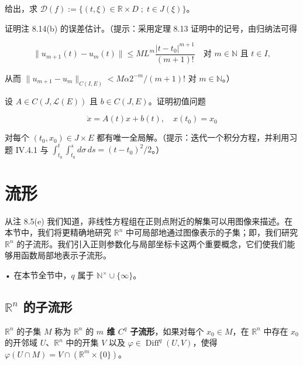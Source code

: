 \begin{exercises}
给出，求 $ \mathcal{D}(f) := \{(t,\xi) \in \mathbb{R}\times D \; ; \; t \in J(\xi)\} $。

\item

证明注 8.14(b) 的误差估计。（提示：采用定理 8.13 证明中的记号，由归纳法可得

\[
\|u_{m+1}(t)-u_{m}(t)\| \le ML^{m}\frac{|t-t_{0}|^{m+1}}{(m+1)!} \quad \text{对 } m \in \mathbb{N} \text{ 且 } t \in I ,
\]

从而 $ \|u_{m+1}-u_{m}\|_{C(I,E)} < M\alpha 2^{-m}/(m+1)! $ 对 $ m \in \mathbb{N} $。）

\item

设 $ A \in C(J,\mathcal{L}(E)) $ 且 $ b \in C(J,E) $。证明初值问题

\[
\dot{x} = A(t)x + b(t) , \quad x(t_{0}) = x_{0}
\]

对每个 $ (t_{0},x_{0}) \in J\times E $ 都有唯一全局解。（提示：迭代一个积分方程，并利用习题 IV.4.1 与 $ \int_{t_{0}}^{t}\int_{t_{0}}^{s} d\sigma\, ds = (t-t_{0})^{2}/2 $。）

\end{exercises}

\section{流形}

从注 8.5(e) 我们知道，非线性方程组在正则点附近的解集可以用图像来描述。在本节中，我们将更精确地研究 $ \mathbb{R}^{n} $ 中可局部地通过图像表示的子集；即，我们研究 $ \mathbb{R}^{n} $ 的子流形。我们引入正则参数化与局部坐标卡这两个重要概念，它们使我们能够用函数局部地表示子流形。

• 在本节全节中，$ q $ 属于 $ \mathbb{N}^{\times} \cup \{\infty\} $。

\subsection*{$ \mathbb{R}^{n} $ 的子流形}

$ \mathbb{R}^{n} $ 的子集 $ M $ 称为 $ \mathbb{R}^{n} $ 的 \textbf{$ m $ 维 $ C^{q} $ 子流形}，如果对每个 $ x_{0} \in M $，在 $ \mathbb{R}^{n} $ 中存在 $ x_{0} $ 的开邻域 $ U $、$ \mathbb{R}^{n} $ 中的开集 $ V $ 以及 $ \varphi \in \operatorname{Diff}^{q}(U, V) $，使得 $ \varphi(U \cap M) = V \cap (\mathbb{R}^{m} \times \{0\}) $。


